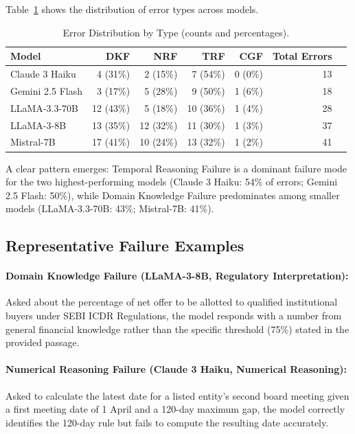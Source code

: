 \documentclass[11pt]{article}
\begin{document}
Table~\ref{tab:error_taxonomy} shows the distribution of error types across
models.

\begin{table}[t]
\centering
\caption{Error Distribution by Type (counts and percentages).}
\label{tab:error_taxonomy}
\begin{tabular}{lrrrrrr}
\toprule
\textbf{Model} & \textbf{DKF} & \textbf{NRF} & \textbf{TRF} & \textbf{CGF} & \textbf{Total Errors} \\
\midrule
Claude 3 Haiku    & 4 (31\%)  & 2 (15\%)  & 7 (54\%)  & 0 (0\%)  & 13 \\
Gemini 2.5 Flash  & 3 (17\%)  & 5 (28\%)  & 9 (50\%)  & 1 (6\%)  & 18 \\
LLaMA-3.3-70B     & 12 (43\%) & 5 (18\%)  & 10 (36\%) & 1 (4\%)  & 28 \\
LLaMA-3-8B        & 13 (35\%) & 12 (32\%) & 11 (30\%) & 1 (3\%)  & 37 \\
Mistral-7B        & 17 (41\%) & 10 (24\%) & 13 (32\%) & 1 (2\%)  & 41 \\
\bottomrule
\end{tabular}
\end{table}

A clear pattern emerges: Temporal Reasoning Failure is a dominant failure mode
for the two highest-performing models (Claude 3 Haiku: 54\% of errors; Gemini
2.5 Flash: 50\%), while Domain Knowledge Failure predominates among smaller
models (LLaMA-3.3-70B: 43\%; Mistral-7B: 41\%).

\subsection{Representative Failure Examples}
\label{sec:failure_examples}

\paragraph{Domain Knowledge Failure (LLaMA-3-8B, Regulatory Interpretation):}
Asked about the percentage of net offer to be allotted to qualified institutional
buyers under SEBI ICDR Regulations, the model responds with a number from general
financial knowledge rather than the specific threshold (75\%) stated in the
provided passage.

\paragraph{Numerical Reasoning Failure (Claude 3 Haiku, Numerical Reasoning):}
Asked to calculate the latest date for a listed entity's second board meeting
given a first meeting date of 1 April and a 120-day maximum gap, the model
correctly identifies the 120-day rule but fails to compute the resulting date
accurately.
\end{document}
